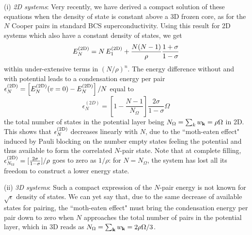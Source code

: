 \documentclass[5p,twocolumn]{elsarticle}
\begin{document}
(i) {\it 2D systems}: Very recently\cite{moth}, we have derived a compact solution of these equations when the density of state is constant above a 3D frozen core, as for the $N$ Cooper pairs  in standard BCS superconductivity. Using this result  for 2D systems which also have a constant density of states, we get
\begin{equation}\label{eq:E2dN}
 E^{{\text{(2D)}}}_N=N\,E^{{\text{(2D)}}}_1+\frac{N(N-1)}{\rho}\frac{1+\sigma}{1-\sigma}
\end{equation}
within under-extensive terms in $(N/\rho)^{n}$.
The energy difference without and with potential
leads to a condensation energy per pair $\epsilon_N^{{\text{(2D)}}} = \left[E_N^{{{\text{(2D)}}}}(v=0)-E_N^{{\text{(2D)}}}\right]/N$ equal to
  \begin{equation}
\epsilon^{(2D)}_N=\left[1-\frac{N-1}{N_\Omega}\right]\frac{2\sigma}{1-\sigma}\Omega\label{eq:E2D}
\end{equation}
 the total number of states in the potential layer being $N_\Omega=\sum_k{}w_{\mathbf{k}}=\rho\Omega$ in 2D. This shows that $\epsilon^{{\text{(2D)}}}_N$  decreases linearly with $N$, due to the ``moth-eaten effect" induced by Pauli blocking on the number empty states feeling the potential and thus available to form the correlated $N$-pair state.  Note that at complete filling, $
\epsilon^{{\text{(2D)}}}_{N_\Omega}=[\frac{2\sigma}{1-\sigma}]/\rho$ goes to zero as $1/\rho$: for $N=N_\Omega$, the system has lost all its freedom to construct a lower energy state.







(ii) {\it 3D systems}: Such a compact expression of the $N$-pair energy is not known for  $\sqrt{\epsilon}$ density of states. We can yet say that, due to the same decrease of available states for pairing, the ``moth-eaten effect" must bring the condensation energy per pair down to zero when $N$ approaches the total number of pairs in the potential layer, which in 3D reads as $N_\Omega=\sum_{\mathbf{k}}w_{\mathbf{k}}=2\rho \Omega/3$. 
\end{document}
